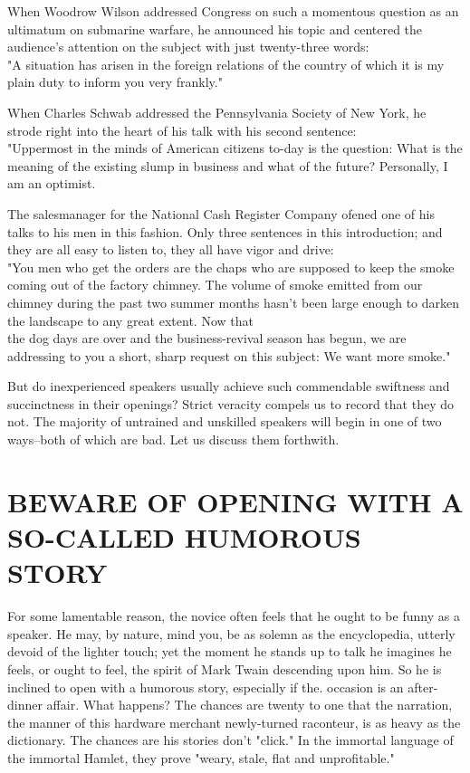 \documentclass[10pt]{article}
\begin{document}
When Woodrow Wilson addressed Congress on such a momentous question as an ultimatum on submarine warfare, he announced his topic and centered the audience's attention on the subject with just twenty-three words:\\
"A situation has arisen in the foreign relations of the country of which it is my plain duty to inform you very frankly."

When Charles Schwab addressed the Pennsylvania Society of New York, he strode right into the heart of his talk with his second sentence:\\
"Uppermost in the minds of American citizens to-day is the question: What is the meaning of the existing slump in business and what of the future? Personally, I am an optimist.

The salesmanager for the National Cash Register Company ofened one of his talks to his men in this fashion. Only three sentences in this introduction; and they are all easy to listen to, they all have vigor and drive:\\
"You men who get the orders are the chaps who are supposed to keep the smoke coming out of the factory chimney. The volume of smoke emitted from our chimney during the past two summer months hasn't been large enough to darken the landscape to any great extent. Now that\\
the dog days are over and the business-revival season has begun, we are addressing to you a short, sharp request on this subject: We want more smoke."

But do inexperienced speakers usually achieve such commendable swiftness and succinctness in their openings? Strict veracity compels us to record that they do not. The majority of untrained and unskilled speakers will begin in one of two ways--both of which are bad. Let us discuss them forthwith.

\section*{BEWARE OF OPENING WITH A SO-CALLED HUMOROUS STORY}
For some lamentable reason, the novice often feels that he ought to be funny as a speaker. He may, by nature, mind you, be as solemn as the encyclopedia, utterly devoid of the lighter touch; yet the moment he stands up to talk he imagines he feels, or ought to feel, the spirit of Mark Twain descending upon him. So he is inclined to open with a humorous story, especially if the. occasion is an after-dinner affair. What happens? The chances are twenty to one that the narration, the manner of this hardware merchant newly-turned raconteur, is as heavy as the dictionary. The chances are his stories don't "click." In the immortal language of the immortal Hamlet, they prove "weary, stale, flat and unprofitable."
\end{document}
